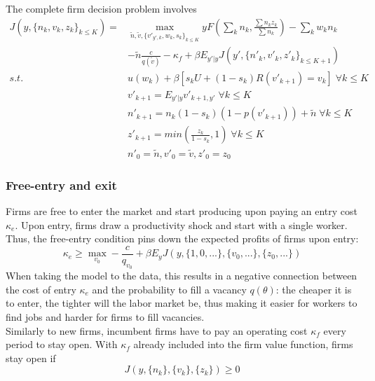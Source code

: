 \begin{definition} \label{firmproblem}
The complete firm decision problem involves
\begin{equation*}
    \begin{split}
 J(y,\{n_k,v_k,z_k\}_{k\leq K}) =
    & \max_{\tilde{n},\tilde{v},\{v'_{y',k},w_{k},s_{k}\}_{k\leq K}} 
    yF(\sum_k n_k,\frac{\sum n_kz_k}{\sum n_k})-
    \sum_k w_kn_k \\
    &-\tilde{n}\frac{c}{q(\tilde{v})}-\kappa_f
    +\beta E_{y'|y} J(y',\{n'_k,v'_k,z'_k\}_{k\leq K+1}) \\
     s.t. \: & u(w_k) + \beta [s_k U + (1-s_k)R(v'_{k+1})=v_k] \; \forall k\leq K \\
    & v'_{k+1} = E_{y'|y} v'_{k+1,y'} \; \forall k\leq K \\
    & n'_{k+1} = n_k(1-s_k)(1-p(v'_{k+1}))+\tilde{n}\; \forall k\leq K \\
    & z'_{k+1} = min(\frac{z_k}{1-s_k},1)\; \forall k\leq K \\
    & n'_0 = \tilde{n}, v'_0 = \tilde{v}, z'_0 = z_0
    \end{split}
\end{equation*}
\end{definition}


\subsubsection*{Free-entry and exit}
Firms are free to enter the market and start producing upon paying an entry cost $\kappa_e$. Upon entry, firms draw a productivity shock and start with a single worker. Thus, the free-entry condition pins down the expected profits of firms upon entry:
\begin{equation} \label{freeentry}
    \kappa_e\geq \max_{v_0} -\frac{c}{q_{v_0}}+\beta E_y J(y,\{1,0,...\},\{v_0,...\},\{z_0,...\})
\end{equation}
When taking the model to the data, this results in a negative connection between the cost of entry $\kappa_e$ and the probability to fill a vacancy $q(\theta)$: the cheaper it is to enter, the tighter will the labor market be, thus making it easier for workers to find jobs and harder for firms to fill vacancies.
\\
Similarly to new firms, incumbent firms have to pay an operating cost $\kappa_f$ every period to stay open. With $\kappa_f$ already included into the firm value function, firms stay open if 
\begin{equation} \label{freeexit}
    J(y,\{n_k\},\{v_k\},\{z_k\})\geq 0
\end{equation}


